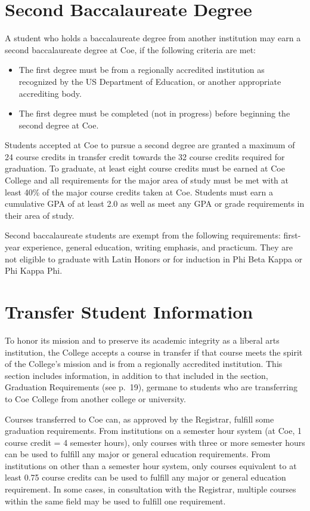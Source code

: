 \documentclass[
  letterpaper,
]{scrbook}
\providecommand{\tightlist}{%
  \setlength{\itemsep}{0pt}\setlength{\parskip}{0pt}}
\begin{document}
\section{Second Baccalaureate Degree}\label{second-baccalaureate-degree}

A student who holds a baccalaureate degree from another institution may
earn a second baccalaureate degree at Coe, if the following criteria are
met:

\begin{itemize}
\tightlist
\item
  The first degree must be from a regionally accredited institution as
  recognized by the US Department of Education, or another appropriate
  accrediting body.
\item
  The first degree must be completed (not in progress) before beginning
  the second degree at Coe.
\end{itemize}

Students accepted at Coe to pursue a second degree are granted a maximum
of 24 course credits in transfer credit towards the 32 course credits
required for graduation. To graduate, at least eight course credits must
be earned at Coe College and all requirements for the major area of
study must be met with at least 40\% of the major course credits taken
at Coe. Students must earn a cumulative GPA of at least 2.0 as well as
meet any GPA or grade requirements in their area of study.

Second baccalaureate students are exempt from the following
requirements: first-year experience, general education, writing
emphasis, and practicum. They are not eligible to graduate with Latin
Honors or for induction in Phi Beta Kappa or Phi Kappa Phi.

\section{Transfer Student
Information}\label{transfer-student-information}

To honor its mission and to preserve its academic integrity as a liberal
arts institution, the College accepts a course in transfer if that
course meets the spirit of the College's mission and is from a
regionally accredited institution. This section includes information, in
addition to that included in the section, Graduation Requirements (see
p.~19), germane to students who are transferring to Coe College from
another college or university.

Courses transferred to Coe can, as approved by the Registrar, fulfill
some graduation requirements. From institutions on a semester hour
system (at Coe, 1 course credit = 4 semester hours), only courses with
three or more semester hours can be used to fulfill any major or general
education requirements. From institutions on other than a semester hour
system, only courses equivalent to at least 0.75 course credits can be
used to fulfill any major or general education requirement. In some
cases, in consultation with the Registrar, multiple courses within the
same field may be used to fulfill one requirement.
\end{document}
